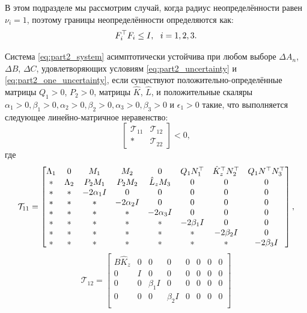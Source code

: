 В этом подразделе мы рассмотрим случай, когда радиус неопределённости равен $\nu_i = 1$, поэтому границы неопределённости определяются как:
%
\begin{equation}
	\label{eq:part2_one_uncertainty}
	{F}_i^\top{F}_i\leq {I}, \ \ i=1,2,3.
\end{equation}
%
\begin{theorem}\label{thm:part2_LMI_1}
	Система \eqref{eq:part2_system} асимптотически устойчива при любом выборе $\Delta {A}_n$, $\Delta {B}$, $\Delta {C}$, удовлетворяющих условиям \eqref{eq:part2_uncertainty} и \eqref{eq:part2_one_uncertainty}, если существуют положительно-определённые матрицы ${Q}_1>0$, ${P}_2>0$, матрицы $\hat{{K}}$, $\hat{{L}}$,
	и положительные скаляры $\alpha_1>0,\beta_1>0,\alpha_2>0,\beta_2>0,\alpha_3>0,\beta_3>0$ и $\epsilon_1 > 0$ такие, что выполняется следующее линейно-матричное неравенство:
	\begin{equation}
		\label{eq:thm3_final_LMI}
		\begin{bmatrix}
			\mathcal{T}_{11} & \mathcal{T}_{12} \\
			* & \mathcal{T}_{22}
		\end{bmatrix}<0,
	\end{equation}
	где
	\begin{equation}
		\mathcal{T}_{11}= \begin{bmatrix}
			{\Lambda}_1 & 0 & {M}_1 & {M}_2&0 & {Q}_1{N}_1^\top & \hat{{K}}_z^\top{N}_2^\top & {Q}_1 {N}^\top{N}_3^\top \\
			* & {\Lambda}_2 & {P}_2{M}_1 & {P}_2{M}_2 & \hat{{L}}_z{M}_3& 0& 0&0\\
			* & * & -2\alpha_1{I} & 0&0&0&0&0\\
			* & * &*  & -2\alpha_2{I}&0&0&0&0\\
			*& * & * &*  &-2\alpha_3{I}&0&0&0\\
			* &* & * & * & *&-2\beta_1{I}&0&0\\
			* & * & * &*& *&*&-2\beta_2{I}& 0\\
			*&*&* &* & * & * & *&-2\beta_3{I}\\
		\end{bmatrix},
	\end{equation}
	\begin{equation}
		\mathcal{T}_{12}= \begin{bmatrix}
			{B}\hat{{K}}_z & 0&0&0&0&0&0&0\\
			0&{I}&0&0&0&0&0&0\\
			0&0& \beta_1{I}&0&0&0&0&0\\
			0&0&0& \beta_2{I}&0&0&0&0\\

\end{bmatrix}
\end{equation}
\end{theorem}

